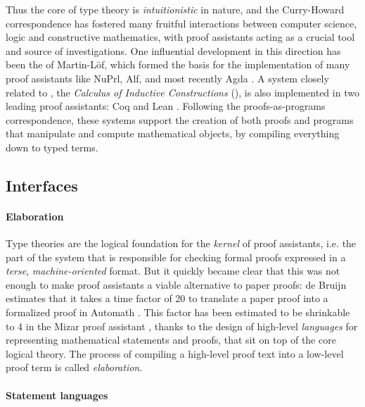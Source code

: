 Thus the core of type theory is \emph{intuitionistic} in nature, and the
Curry-Howard correspondence has fostered many fruitful interactions between
computer science, logic and constructive mathematics, with proof assistants
acting as a crucial tool and source of investigations. One influential
development in this direction has been the  of
Martin-Löf, which formed the basis for the implementation of many proof
assistants like NuPrl, Alf, and most recently Agda \cite{geuvers_proof_2009}. A
system closely related to , the \emph{Calculus of
Inductive Constructions} (), is also implemented in two leading proof
assistants: Coq  and Lean
. Following the proofs-as-programs
correspondence, these systems support the creation of both proofs and programs
that manipulate and compute mathematical objects, by compiling everything down
to typed terms.

\subsection{Interfaces}

\paragraph{Elaboration}

Type theories are the logical foundation for the \emph{kernel} of proof
assistants, i.e. the part of the system that is responsible for checking formal
proofs expressed in a \emph{terse}, \emph{machine-oriented} format. But it
quickly became clear that this was not enough to make proof assistants a viable
alternative to paper proofs: de Bruijn estimates that it takes a time factor of
20 to translate a paper proof into a formalized proof in Automath
. This factor has been estimated to
be shrinkable to 4 in the Mizar proof assistant ,
thanks to the design of high-level \emph{languages} for representing
mathematical statements and proofs, that sit on top of the core logical
theory. The
process of compiling a high-level proof text into a low-level proof term is
called \emph{elaboration}.

\paragraph{Statement languages}

